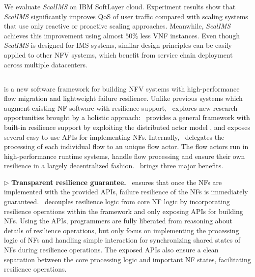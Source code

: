 We evaluate \textit{ScalIMS} on IBM SoftLayer cloud. Experiment results show that \textit{ScalIMS} significantly improves QoS of user traffic compared with scaling systems that use only reactive or proactive scaling approaches. Meanwhile, \textit{ScalIMS} achieves this improvement %
 using almost $50\%$ less VNF instances. %
Even though \textit{ScalIMS} is designed for IMS systems, similar design principles can be easily applied to other NFV systems, which benefit from service chain deployment across multiple datacenters.

\subsection{\nfactor}

\nfactor is a new software framework for building NFV systems with high-performance flow migration and lightweight failure resilience. Unlike previous systems \cite{sherry2015rollback, rajagopalan2013pico, rajagopalan2013split, gember2015opennf} which augment existing NF software with resilience support, \nfactor~explores new research opportunities brought by a holistic approach: \nfactor~provides a general framework with built-in resilience support by exploiting the distributed actor model \cite{actor-wiki}, and exposes several easy-to-use APIs for implementing NFs. Internally, \nfactor~delegates the processing of each individual flow to an unique flow actor. The flow actors run in high-performance runtime systems, handle flow processing and ensure their own resilience in a largely decentralized fashion. \nfactor~brings three major benefits.

$\triangleright$ \textbf{Transparent resilience guarantee.} \nfactor~ensures that once the NFs are implemented with the provided APIs, failure resilience of the NFs is immediately guaranteed. \nfactor~decouples resilience logic from core NF logic by incorporating resilience operations within the framework and only exposing APIs for building NFs. Using the APIs, programmers are fully liberated from reasoning about details of resilience operations, but only focus on implementing the processing logic of NFs and handling simple interaction for synchronizing shared states of NFs during resilience operations. The exposed APIs also ensure a clean separation between the core processing logic and important NF states, facilitating resilience operations.

